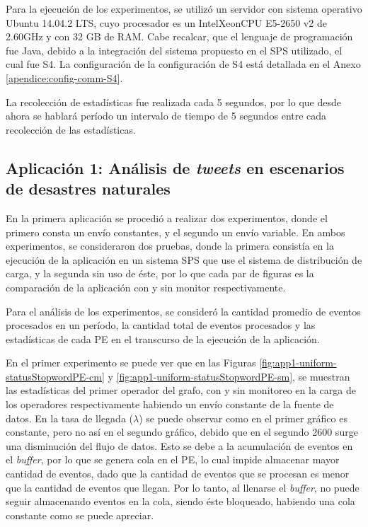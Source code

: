 Para la ejecución de los experimentos, se utilizó un servidor con sistema operativo Ubuntu 14.04.2 LTS, cuyo procesador es un Intel\textregistered Xeon\textregistered CPU E5-2650 v2 de 2.60GHz y con 32 GB de RAM. Cabe recalcar, que el lenguaje de programación fue Java, debido a la integración del sistema propuesto en el SPS utilizado, el cual fue S4. La configuración de la configuración de S4 está detallada en el Anexo \ref{apendice:config-comm-S4}.

La recolección de estadísticas fue realizada cada 5 segundos, por lo que desde ahora se hablará período un intervalo de tiempo de 5 segundos entre cada recolección de las estadísticas.

\subsection{Aplicación 1: Análisis de \textit{tweets} en escenarios de desastres naturales}
En la primera aplicación se procedió a realizar dos experimentos, donde el primero consta un envío constantes, y el segundo un envío variable. En ambos experimentos, se consideraron dos pruebas, donde la primera consistía en la ejecución de la aplicación en un sistema SPS que use el sistema de distribución de carga, y la segunda sin uso de éste, por lo que cada par de figuras es la comparación de la aplicación con y sin monitor respectivamente.

Para el análisis de los experimentos, se consideró la cantidad promedio de eventos procesados en un período, la cantidad total de eventos procesados y las estadísticas de cada PE en el transcurso de la ejecución de la aplicación.

En el primer experimento se puede ver que en las Figuras \ref{fig:app1-uniform-statusStopwordPE-cm} y \ref{fig:app1-uniform-statusStopwordPE-sm}, se muestran las estadísticas del primer operador del grafo, con y sin monitoreo en la carga de los operadores respectivamente habiendo un envío constante de la fuente de datos. En la tasa de llegada ($\lambda$) se puede observar como en el primer gráfico es constante, pero no así en el segundo gráfico, debido que en el segundo 2600 surge una disminución del flujo de datos. Esto se debe a la acumulación de eventos en el \textit{buffer}, por lo que se genera cola en el PE, lo cual impide almacenar mayor cantidad de eventos, dado que la cantidad de eventos que se procesan es menor que la cantidad de eventos que llegan. Por lo tanto, al llenarse el \textit{buffer}, no puede seguir almacenando eventos en la cola, siendo éste bloqueado, habiendo una cola constante como se puede apreciar.

